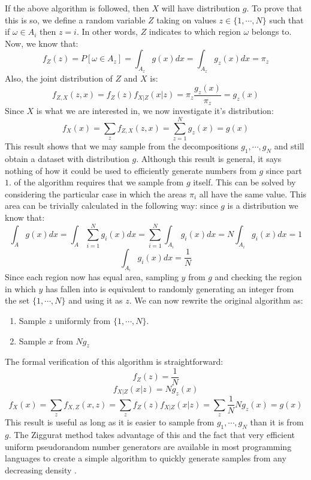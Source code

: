 \documentclass[11pt,onecolumn]{article}
\begin{document}
If the above algorithm is followed, then $X$ will have distribution $g$. To prove that this is so, we define a random variable $Z$ taking on values $z\in\{1,\dotsb,N\}$ such that if $\omega\in A_i$ then $z=i$. In other words, $Z$ indicates to which region $\omega$ belongs to. Now, we know that:
$$f_Z(z)=P[\omega\in A_z]=\int_{A_z} g(x)dx=\int_{A_z} g_z(x)dx=\pi_z$$
Also, the joint distribution of $Z$ and $X$ is:
$$f_{Z,X}(z,x)=f_Z(z)f_{X|Z}(x|z)=\pi_z\frac{g_z(x)}{\pi_z}=g_z(x)$$
Since $X$ is what we are interested in, we now investigate it's distribution:
$$f_X(x)=\sum_z f_{Z,X}(z,x)=\sum_{z=1}^N g_z(x)=g(x)$$ 
This result shows that we may sample from the decompositions $g_1,\dotsb,g_N$ and still obtain a dataset with distribution $g$. Although this result is general, it says nothing of how it could be used to efficiently generate numbers from $g$ since part $1.$ of the algorithm requires that we sample from $g$ itself. This can be solved by considering the particular case in which the areas $\pi_i$ all have the same value. This area can be trivially calculated in the following way: since $g$ is a distribution we know that:
$$\int_A g(x)dx=\int_A \sum_{i=1}^N g_i(x)dx=\sum_{i=1}^N \int_{A_i} g_i(x)dx=N\int_{A_i} g_i(x)dx=1$$
$$\int_{A_i} g_i(x)dx=\frac{1}{N}$$
Since each region now has equal area, sampling $y$ from $g$ and checking the region in which $y$ has fallen into is equivalent to randomly generating an integer from the set $\{1,\dotsb,N\}$ and using it as $z$. We can now rewrite the original algorithm as:
\begin{enumerate}
	\item Sample $z$ uniformly from $\{1,\dotsb,N\}$.
	\item Sample $x$ from $Ng_z$
\end{enumerate}
The formal verification of this algorithm is straightforward:
$$f_Z(z)=\frac{1}{N}$$
$$f_{X|Z}(x|z)=Ng_z(x)$$
$$f_X(x)=\sum_z f_{X,Z}(x,z) = \sum_z f_Z(z)f_{X|Z}(x|z)=\sum_z \frac{1}{N}Ng_z(x)=g(x)$$
This result is useful as long as it is easier to sample from $g_1,\dotsb,g_N$ than it is from $g$. The Ziggurat method takes advantage of this and the fact that very efficient uniform pseudorandom number generators are available in most programming languages to create a simple algorithm to quickly generate samples from any decreasing density \cite{marsaglia&tsang}.
\end{document}
